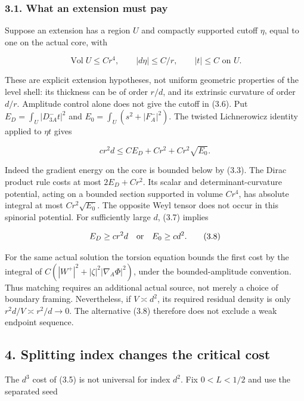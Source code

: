 \documentclass[
  10pt,
]{article}
\begin{document}
\hypertarget{what-an-extension-must-pay}{%
\subsubsection{3.1. What an extension must
pay}\label{what-an-extension-must-pay}}

Suppose an extension has a region \(U\) and compactly supported cutoff
\(\eta\), equal to one on the actual core, with

\[
 \operatorname{Vol}U\le C r^4,\qquad |d\eta|\le C/r,
 \qquad |t|\le C \text{ on }U.
 \tag{3.6}
\]

These are explicit extension hypotheses, not uniform geometric
properties of the level shell: its thickness can be of order \(r/d\),
and its extrinsic curvature of order \(d/r\). Amplitude control alone
does not give the cutoff in (3.6). Put \(E_D=\int_U|D^-_{3A}t|^2\) and
\(E_0=\int_U(s^2+|F_A^-|^2)\). The twisted Lichnerowicz identity applied
to \(\eta t\) gives

\[
 \boxed{c r^2d\le C E_D+C r^2+C r^2\sqrt{E_0}.}
 \tag{3.7}
\]

Indeed the gradient energy on the core is bounded below by (3.3). The
Dirac product rule costs at most \(2E_D+Cr^2\). Its scalar and
determinant-curvature potential, acting on a bounded section supported
in volume \(Cr^4\), has absolute integral at most \(Cr^2\sqrt{E_0}\).
The opposite Weyl tensor does not occur in this spinorial potential. For
sufficiently large \(d\), (3.7) implies

\[
 E_D\ge c r^2d\quad\hbox{or}\quad E_0\ge c d^2.
 \tag{3.8}
\]

For the same actual solution the torsion equation bounds the first cost
by the integral of \(C(|W^+|^2+|\zeta|^2|\nabla_A\Phi|^2)\), under the
bounded-amplitude convention. Thus matching requires an additional
actual source, not merely a choice of boundary framing. Nevertheless, if
\(V\asymp d^2\), its required residual density is only
\(r^2d/V\asymp r^2/d\to0\). The alternative (3.8) therefore does not
exclude a weak endpoint sequence.

\hypertarget{splitting-index-changes-the-critical-cost}{%
\subsection{4. Splitting index changes the critical
cost}\label{splitting-index-changes-the-critical-cost}}

The \(d^3\) cost of (3.5) is not universal for index \(d^2\). Fix
\(0<L<1/2\) and use the separated seed
\end{document}
